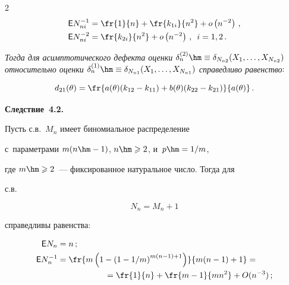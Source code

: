 \begin{multicols}{2}
\begin{align*}


{\sf E} N_{ni}^{-1} &= \fr{1}{n} + \fr{k_{1i}}{n^2} + o\left(n^{-2}\right)\,,


\\


{\sf E} N_{ni}^{-2} &= \fr{k_{2i}}{n^2} + o \left(n^{-2}\right)\,,\enskip  i = 1,2\,.


\end{align*}


\textit{Тогда для асимптотического дефекта оценки $\delta_{n}^{(2)}\hm \equiv 


\delta_{N_{n2}}(X_1,\ldots,X_{N_{n2}})$ относительно оценки $\delta_{n}^{(1)}\hm 


\equiv \delta_{N_{n1}}(X_1,\ldots,X_{N_{n1}})$ справедливо равенство}:


$$


d_{21}(\theta) = \fr{a(\theta)(k_{12} - k_{11}) + b(\theta) (k_{22} - 


k_{21})}{a(\theta)}\,.


$$





\noindent


\textbf{Следствие~4.2.}\ 


Пусть с.в.~$M_n$ имеет биномиальное распределение 


с~параметрами $m(n\hm-1)$, $n\hm \geqslant 2$, и~$p \hm= 1/m$, 


где $m\hm \geqslant 2$~--- фиксированное натуральное число. Тогда для 


с.в.


$$


N_n = M_n + 1


$$


справедливы равенства:


\begin{align*}


{\sf E} N_n &= n\,;


\\


{\sf E} N_n^{-1} &= \fr{m\left(1 - \left(1 - {1}/{m}\right)^{m(n-1)+1}\right)}


{m(n - 1) + 1} = {}\\


&\hspace*{20mm}{}=\fr{1}{n}+


\fr{m - 1}{mn^2} + O(n^{-3})\,;


\\



\end{align*}
\end{multicols}
